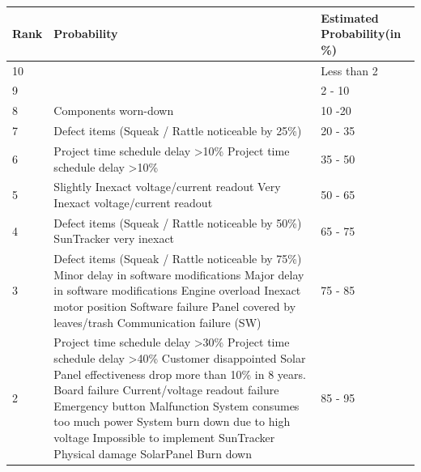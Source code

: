 \documentclass[12pt,a4paper]{report}
\begin{document}
\noindent\begin{tabular}{|l|p{10cm}|p{4cm}|}
\hline Rank & Probability & Estimated Probability\newline (in \%) \\ 

\hline 10 &  & Less than 2 \\ 

\hline 9 &  & 2 - 10 \\ 

\hline 8 & Components worn-down & 10 -20  \\ 

\hline 7 & Defect items (Squeak / Rattle noticeable by 25\%) & 20 - 35 \\ 

\hline 6 &Project time schedule delay  \textgreater 10\% \newline
Project time schedule delay \textgreater 10\%  & 35 - 50 \\ 

\hline 5 & Slightly Inexact voltage/current readout\newline
Very Inexact voltage/current readout & 50 - 65 \\ 

\hline 4 & Defect items (Squeak / Rattle noticeable by 50\%)\newline
SunTracker very inexact & 65 - 75 \\ 

\hline 3 & Defect items (Squeak / Rattle noticeable by 75\%)\newline
Minor delay in software modifications\newline
Major delay in software modifications\newline
Engine overload\newline
Inexact motor position\newline
Software failure\newline
Panel covered by leaves/trash\newline
Communication failure (SW) & 75 - 85 \\ 

\hline 2 & Project time schedule delay \textgreater 30\%\newline
Project time schedule delay \textgreater 40\%\newline
Customer disappointed\newline
Solar Panel effectiveness drop more than 10\% in 8 years.\newline
Board failure\newline
Current/voltage readout failure\newline
Emergency button Malfunction\newline
System consumes too much power\newline
System burn down due to high voltage\newline
Impossible to implement SunTracker\newline
Physical damage\newline
SolarPanel Burn down & 85 - 95  \\ 


\end{tabular}
\end{document}
